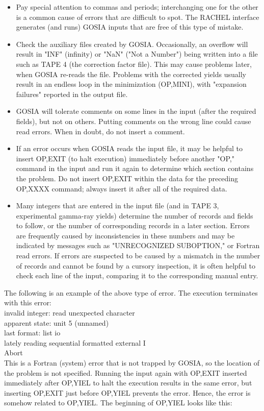 \documentclass[10pt]{article}
\begin{document}
\begin{itemize}
  \item Pay special attention to commas and periods; interchanging one for the other is a common cause of errors that are difficult to spot. The RACHEL interface generates (and runs) GOSIA inputs that are free of this type of mistake.
  \item Check the auxiliary files created by GOSIA. Occasionally, an overflow will result in "INF" (infinity) or "NaN" ("Not a Number") being written into a file such as TAPE 4 (the correction factor file). This may cause problems later, when GOSIA re-reads the file. Problems with the corrected yields usually result in an endless loop in the minimization (OP,MINI), with "expansion failures" reported in the output file.
  \item GOSIA will tolerate comments on some lines in the input (after the required fields), but not on others. Putting comments on the wrong line could cause read errors. When in doubt, do not insert a comment.
  \item If an error occurs when GOSIA reads the input file, it may be helpful to insert OP,EXIT (to halt execution) immediately before another "OP," command in the input and run it again to determine which section contains the problem. Do not insert OP,EXIT within the data for the preceding OP,XXXX command; always insert it after all of the required data.
  \item Many integers that are entered in the input file (and in TAPE 3, experimental gamma-ray yields) determine the number of records and fields to follow, or the number of corresponding records in a later section. Errors are frequently caused by inconsistencies in these numbers and may be indicated by messages such as "UNRECOGNIZED SUBOPTION," or Fortran read errors. If errors are suspected to be caused by a mismatch in the number of records and cannot be found by a cursory inspection, it is often helpful to check each line of the input, comparing it to the corresponding manual entry.
\end{itemize}

The following is an example of the above type of error. The execution terminates with this error:\\
invalid integer: read unexpected character\\
apparent state: unit 5 (unnamed)\\
last format: list io\\
lately reading sequential formatted external I\\
Abort\\
This is a Fortran (system) error that is not trapped by GOSIA, so the location of the problem is not specified. Running the input again with OP,EXIT inserted immediately after OP,YIEL to halt the execution results in the same error, but inserting OP,EXIT just before OP,YIEL prevents the error. Hence, the error is somehow related to OP,YIEL. The beginning of OP,YIEL looks like this:
\end{document}
